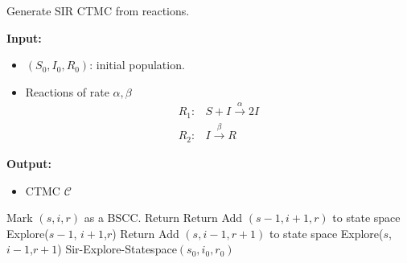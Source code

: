 \begin{algorithm}[H]
    \caption{Generate SIR CTMC from reactions.}
    \label{alg:gen-sir-ctmc}
    \footnotesize{
        \hspace*{\algorithmicindent} \textbf{Input:}
        \begin{itemize}[noitemsep,topsep=0pt]
            \item $(S_0, I_0, R_0)$: initial population.
            \item Reactions of rate $\alpha,\beta$
                  \begin{align*}
                      R_1: & S + I \xrightarrow{\alpha} 2I \\
                      R_2: & I     \xrightarrow{\beta} R
                  \end{align*}
        \end{itemize}
        \hspace*{\algorithmicindent} \textbf{Output:}
        \begin{itemize}[noitemsep,topsep=0pt]
            \item CTMC $\mathcal{C}$
        \end{itemize}
    }
    \begin{algorithmic}[1]
        \State Mark $(s,i,r)$ as a BSCC.
        \State Return
        \EndIf
        \State Return
        \EndIf
        \State Add $(s-1, i+1, r)$ to state space
        \State Explore($s-1$, $i+1$,$r$)
        \EndIf
        \State Return
        \EndIf
        \State Add $(s, i-1, r+1)$ to state space
        \State Explore($s$, $i-1$,$r+1$)
        \EndIf
        \EndProcedure
        \State Sir-Explore-Statespace$(s_0,i_0,r_0)$
        \EndProcedure
    \end{algorithmic}
\end{algorithm}

